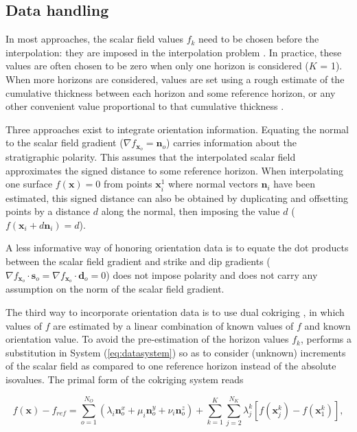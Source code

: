 \documentclass[preprint]{ring20}
\newcommand{\bx}{\mathbf{x}}
\newcommand{\bn}{\mathbf{n}}
\begin{document}
 
\subsection {Data handling}

In most approaches, the scalar field values $f_k$ need to be chosen before the interpolation: they are imposed in the interpolation problem \citep[e.g., ][]{Frank2007CG,Hillier2014MG,Renaudeau2019MG,Irakarama2022CD}. In practice, these values are often chosen to be zero when only one horizon is considered ($K$ = 1). When more horizons are considered, values are set using a rough estimate of the cumulative thickness between each horizon and some reference horizon, or any other convenient value proportional to that cumulative thickness \citep{Caumon2013GaRSITo,Collon-Drouaillet2015C&G,Collon2016I}. 

Three approaches exist to integrate orientation information. Equating the normal to the scalar field gradient ($\nabla f_{\bx_o} = \mathbf{n}_o$) carries information about the stratigraphic polarity. This assumes that the interpolated scalar field approximates the signed distance to some reference horizon. When interpolating one surface $f(\bx) = 0$ from points $\bx^1_i$ where normal vectors $\mathbf{n}_i$ have been estimated, this signed distance can also be obtained by duplicating and offsetting points by a distance $d$ along the normal, then imposing the value $d$ ($f(\bx_i + d \mathbf{n}_i) = d$). 

A less informative way of honoring orientation data is to equate the dot products between the scalar field gradient and strike and dip gradients ($\nabla f_{\bx_o} \cdot \mathbf{s}_o = \nabla f_{\bx_o} \cdot \mathbf{d}_o = 0$) does not impose polarity and does not carry any assumption on the norm of the scalar field gradient. 

The third way to incorporate orientation data is to use dual cokriging \citep[DcK, ][]{Lajaunie1997MG,Chiles04OMSMP}, in which values of $f$ are estimated by a linear combination of known values of $f$ and known orientation value. To avoid the pre-estimation of the horizon values $f_k$, performs a substitution in System (\ref{eq:datasystem}) so as to consider (unknown) increments of the scalar field as compared to one reference horizon instead of the absolute isovalues. The primal form of the cokriging system reads

\begin{equation}
\label{eq:DcK}
f(\bx) - f_{ref} = \sum_{o=1}^{N_O} (\lambda_i \bn_o^x + \mu_i \bn_o^y + \nu_i \bn_o^z) + \sum_{k=1}^{K} \sum_{j=2}^{N_K} \lambda_{j}^{k}[f(\bx_j^k) - f(\bx_1^k)], 
\end{equation}
\end{document}
